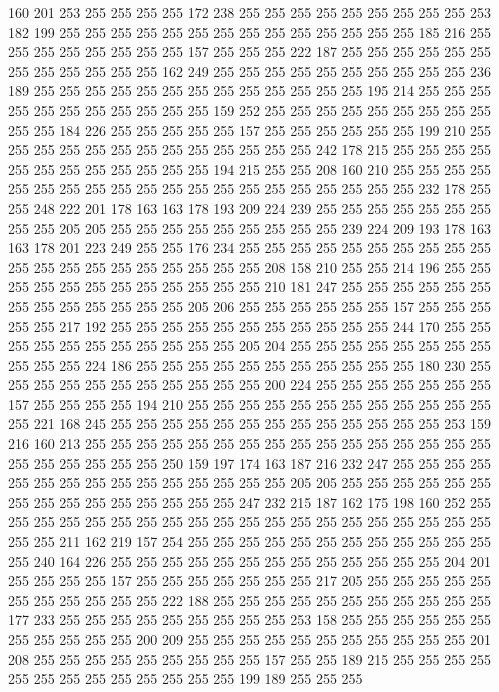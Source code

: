 160 201 253 255 255 255 255 172 238 255 255 255 255 255 255 255 255 255 253 182
199 255 255 255 255 255 255 255 255 255 255 255 255 255 255 185 216 255 255 255
255 255 255 255 255 157 255 255 255 222 187 255 255 255 255 255 255 255 255 255
255 255 255 162 249 255 255 255 255 255 255 255 255 255 255 236 189 255 255 255
255 255 255 255 255 255 255 255 255 255 195 214 255 255 255 255 255 255 255 255
255 255 255 159 252 255 255 255 255 255 255 255 255 255 255 255 184 226 255 255
255 255 255 157 255 255 255 255 255 255 199 210 255 255 255 255 255 255 255 255
255 255 255 255 255 242 178 215 255 255 255 255 255 255 255 255 255 255 255 255
194 215 255 255 208 160 210 255 255 255 255 255 255 255 255 255 255 255 255 255
255 255 255 255 255 255 255 232 178 255 255 248 222 201 178 163 163 178 193 209
224 239 255 255 255 255 255 255 255 255 255 205 205 255 255 255 255 255 255 255
255 255 239 224 209 193 178 163 163 178 201 223 249 255 255 176 234 255 255 255
255 255 255 255 255 255 255 255 255 255 255 255 255 255 255 255 255 208 158 210
255 255 214 196 255 255 255 255 255 255 255 255 255 255 255 255 210 181 247 255
255 255 255 255 255 255 255 255 255 255 255 255 205 206 255 255 255 255 255 255
157 255 255 255 255 255 217 192 255 255 255 255 255 255 255 255 255 255 255 244
170 255 255 255 255 255 255 255 255 255 255 255 205 204 255 255 255 255 255 255
255 255 255 255 255 224 186 255 255 255 255 255 255 255 255 255 255 255 180 230
255 255 255 255 255 255 255 255 255 255 255 200 224 255 255 255 255 255 255 255
157 255 255 255 255 194 210 255 255 255 255 255 255 255 255 255 255 255 255 255
221 168 245 255 255 255 255 255 255 255 255 255 255 255 255 255 253 159 216 160
213 255 255 255 255 255 255 255 255 255 255 255 255 255 255 255 255 255 255 255
255 255 255 250 159 197 174 163 187 216 232 247 255 255 255 255 255 255 255 255
255 255 255 255 255 255 255 205 205 255 255 255 255 255 255 255 255 255 255 255
255 255 255 255 247 232 215 187 162 175 198 160 252 255 255 255 255 255 255 255
255 255 255 255 255 255 255 255 255 255 255 255 255 255 255 211 162 219 157 254
255 255 255 255 255 255 255 255 255 255 255 255 255 240 164 226 255 255 255 255
255 255 255 255 255 255 255 255 255 204 201 255 255 255 255 157 255 255 255 255
255 255 255 217 205 255 255 255 255 255 255 255 255 255 255 255 222 188 255 255
255 255 255 255 255 255 255 255 255 177 233 255 255 255 255 255 255 255 255 255
253 158 255 255 255 255 255 255 255 255 255 255 255 200 209 255 255 255 255 255
255 255 255 255 255 255 201 208 255 255 255 255 255 255 255 255 255 157 255 255
189 215 255 255 255 255 255 255 255 255 255 255 255 255 255 199 189 255 255 255
